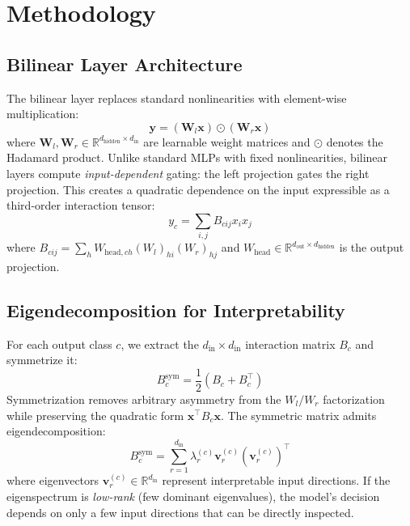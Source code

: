 
\section{Methodology}
\label{sec:methodology}

\subsection{Bilinear Layer Architecture}

The bilinear layer replaces standard nonlinearities with element-wise multiplication:
\begin{equation}
    \mathbf{y} = (\mathbf{W}_l \mathbf{x}) \odot (\mathbf{W}_r \mathbf{x})
    \label{eq:bilinear}
\end{equation}
where $\mathbf{W}_l, \mathbf{W}_r \in \mathbb{R}^{d_{\text{hidden}} \times d_{\text{in}}}$ are learnable weight matrices and $\odot$ denotes the Hadamard product.
Unlike standard MLPs with fixed nonlinearities, bilinear layers compute \emph{input-dependent} gating: the left projection gates the right projection.
This creates a quadratic dependence on the input expressible as a third-order interaction tensor:
\begin{equation}
    y_c = \sum_{i,j} B_{cij} x_i x_j
    \label{eq:tensor}
\end{equation}
where $B_{cij} = \sum_h W_{\text{head},ch} (W_l)_{hi} (W_r)_{hj}$ and $W_{\text{head}} \in \mathbb{R}^{d_{\text{out}} \times d_{\text{hidden}}}$ is the output projection.

\subsection{Eigendecomposition for Interpretability}

For each output class $c$, we extract the $d_{\text{in}} \times d_{\text{in}}$ interaction matrix $B_c$ and symmetrize it:
\begin{equation}
    B_c^{\text{sym}} = \frac{1}{2}(B_c + B_c^\top)
\end{equation}
Symmetrization removes arbitrary asymmetry from the $W_l / W_r$ factorization while preserving the quadratic form $\mathbf{x}^\top B_c \mathbf{x}$.
The symmetric matrix admits eigendecomposition:
\begin{equation}
    B_c^{\text{sym}} = \sum_{r=1}^{d_{\text{in}}} \lambda_r^{(c)} \mathbf{v}_r^{(c)} (\mathbf{v}_r^{(c)})^\top
\end{equation}
where eigenvectors $\mathbf{v}_r^{(c)} \in \mathbb{R}^{d_{\text{in}}}$ represent interpretable input directions.
If the eigenspectrum is \emph{low-rank} (few dominant eigenvalues), the model's decision depends on only a few input directions that can be directly inspected.

